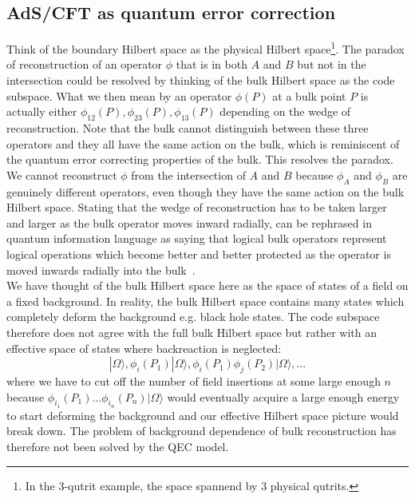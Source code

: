 \documentclass{PoS}
\newcommand{\ket}[1]{|#1\rangle}
\begin{document}
\subsection{AdS/CFT as quantum error correction}
Think of the boundary Hilbert space as the physical Hilbert space\footnote{In the $3$-qutrit example, the space spannend by $3$ physical qutrits.}. The paradox of reconstruction of an operator $\phi$ that is in both $A$ and $B$ but not in the intersection could be resolved by thinking of the bulk Hilbert space as the code subspace. What we then mean by an operator $\phi(P)$ at a bulk point $P$ is actually either $\phi_{12}(P), \phi_{23}(P),\phi_{13}(P)$ depending on the wedge of reconstruction. Note that the bulk cannot distinguish between these three operators and they all have the same action on the bulk, which is reminiscent of the quantum error correcting properties of the bulk. This resolves the paradox. We cannot reconstruct $\phi$ from the intersection of $A$ and $B$ because $\phi_{A}$ and $\phi_B$ are genuinely different operators, even though they have the same action on the bulk Hilbert space. Stating that the wedge of reconstruction has to be taken larger and larger as the bulk operator moves inward radially, can be rephrased in quantum information language as saying that logical bulk operators represent logical operations which become better and better protected as the operator is moved inwards radially into the bulk~\cite{Almheiri:2014lwa}.\\

We have thought of the bulk Hilbert space here as the space of states of a field on a fixed background. In reality, the bulk Hilbert space contains many states which completely deform the background e.g. black hole states. The code subspace therefore does not agree with the full bulk Hilbert space but rather with an effective space of states where backreaction is neglected:
\begin{equation}
\ket{\Omega}, \phi_i(P_1)\ket{\Omega}, \phi_{i}(P_1)\phi_{j}(P_2)\ket{\Omega},\ldots
\end{equation}
where we have to cut off the number of field insertions at some large enough $n$ because \newline $\phi_{i_1}(P_1)\ldots\phi_{i_n}(P_n)\ket{\Omega}$ would eventually acquire a large enough energy to start deforming the background and our effective Hilbert space picture would break down. The problem of background dependence of bulk reconstruction has therefore not been solved by the QEC model.
\end{document}
